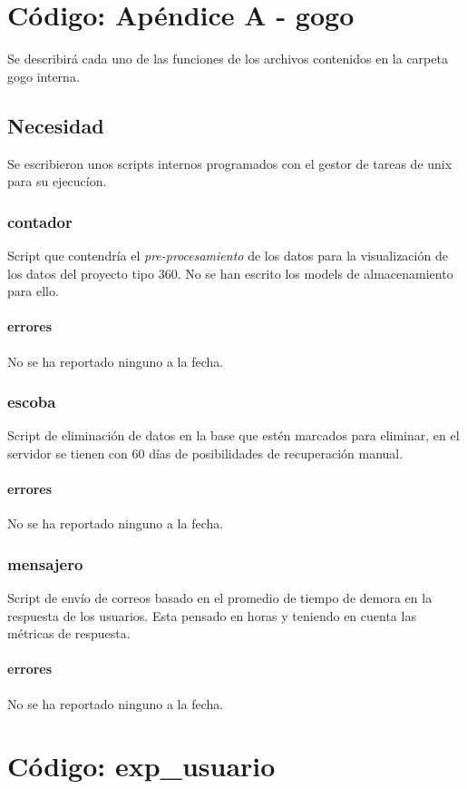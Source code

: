 \documentclass[10pt,a4paper]{book}
\begin{document}
	\chapter{Código: Apéndice A - gogo}

	Se describirá cada uno de las funciones de los archivos contenidos en la carpeta gogo interna.

	\section{Necesidad}

	Se escribieron unos scripts internos programados con el gestor de tareas de unix para su ejecucíon.

	\subsection{contador}
	Script que contendría el \textit{pre-procesamiento} de los datos para la visualización de los datos del proyecto tipo 360. No se han escrito los models de almacenamiento para ello.
	\subsubsection{errores}
	No se ha reportado ninguno a la fecha.

	\subsection{escoba}
	Script de eliminación de datos en la base que estén marcados para eliminar, en el servidor se tienen con 60 días de posibilidades de recuperación manual.
	\subsubsection{errores}
	No se ha reportado ninguno a la fecha.

	\subsection{mensajero}
	Script de envío de correos basado en el promedio de tiempo de demora en la respuesta de los usuarios. Esta pensado en horas y teniendo en cuenta las métricas de respuesta.
	\subsubsection{errores}
	No se ha reportado ninguno a la fecha.


	\chapter{Código: exp_usuario}
\end{document}
